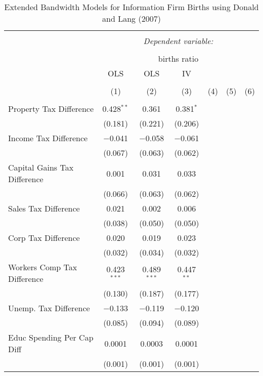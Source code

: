 
\begin{table}[!htbp] \centering 
  \caption{Extended Bandwidth Models for  Information Firm Births using Donald and Lang (2007)} 
  \label{} 
\begin{tabular}{@{\extracolsep{5pt}}lcccccc} 
\\[-1.8ex]\hline 
\hline \\[-1.8ex] 
 & \multicolumn{6}{c}{\textit{Dependent variable:}} \\ 
\cline{2-7} 
\\[-1.8ex] & \multicolumn{6}{c}{births ratio} \\ 
 & OLS & OLS & IV &  &  &  \\ 
\\[-1.8ex] & (1) & (2) & (3) & (4) & (5) & (6)\\ 
\hline \\[-1.8ex] 
 Property Tax Difference & 0.428$^{**}$ & 0.361 & 0.381$^{*}$ &  &  &  \\ 
  & (0.181) & (0.221) & (0.206) &  &  &  \\ 
  Income Tax Difference & $-$0.041 & $-$0.058 & $-$0.061 &  &  &  \\ 
  & (0.067) & (0.063) & (0.062) &  &  &  \\ 
  Capital Gains Tax Difference & 0.001 & 0.031 & 0.033 &  &  &  \\ 
  & (0.066) & (0.063) & (0.062) &  &  &  \\ 
  Sales Tax Difference & 0.021 & 0.002 & 0.006 &  &  &  \\ 
  & (0.038) & (0.050) & (0.050) &  &  &  \\ 
  Corp Tax Difference & 0.020 & 0.019 & 0.023 &  &  &  \\ 
  & (0.032) & (0.034) & (0.032) &  &  &  \\ 
  Workers Comp Tax Difference & 0.423$^{***}$ & 0.489$^{***}$ & 0.447$^{**}$ &  &  &  \\ 
  & (0.130) & (0.187) & (0.177) &  &  &  \\ 
  Unemp. Tax Difference & $-$0.133 & $-$0.119 & $-$0.120 &  &  &  \\ 
  & (0.085) & (0.094) & (0.089) &  &  &  \\ 
  Educ Spending Per Cap Diff & 0.0001 & 0.0003 & 0.0001 &  &  &  \\ 
  & (0.001) & (0.001) & (0.001) &  &  &  \\ 

\end{tabular}
\end{table}
